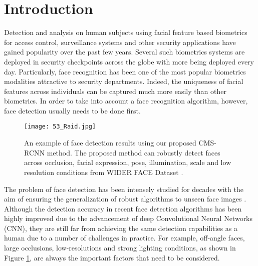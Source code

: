 \documentclass[10pt,journal,cspaper,compsoc]{IEEEtran}
\begin{document}
\maketitle

\IEEEdisplaynotcompsoctitleabstractindextext


\IEEEpeerreviewmaketitle


\section{Introduction}

Detection and analysis on human subjects using facial feature based biometrics for access control, surveillance systems and other security applications have gained popularity over the past few years. Several such biometrics systems are deployed in security checkpoints across the globe with more being deployed every day.
Particularly, face recognition has been one of the most popular biometrics modalities attractive to security departments. Indeed, the uniqueness of facial features across individuals can be captured much more easily than other biometrics. In order to take into account a face recognition algorithm, however, face detection usually needs to be done first.
\begin{figure}[!t]
	\centering \texttt{[image: 53\_Raid.jpg]}
		\caption{An example of face detection results using our proposed CMS-RCNN method. The proposed method can robustly detect faces across occlusion, facial expression, pose, illumination, scale and low resolution conditions from WIDER FACE Dataset \cite{yang2016wider}. }
	\label{fig:face_det_1}
\end{figure}

The problem of face detection has been intensely studied for decades with the aim of ensuring the generalization of robust algorithms to unseen face images \cite{viola2001rapid,zhang2010survey,zhu2012face,li2013learning,li2013pep-adapt,markuvs2013pico,li2014exemplar,mathias2014face,chen2014jointcascade,yang2014acf-multiscale,ghiasi2015multireshpm,liao2014npdface}. Although the detection accuracy in recent face detection algorithms \cite{li2015cascadecnn,farfade2015ddfd,yang2015faceness,ranjan2015dp2mfd,yang2015ccf,ranjan2016hyperface} has been highly improved due to the advancement of deep Convolutional Neural Networks (CNN), they are still far from achieving the same detection capabilities as a human due to a number of challenges in practice. For example, off-angle faces, large occlusions, low-resolutions and strong lighting conditions, as shown in Figure \ref{fig:face_det_1}, are always the important factors that need to be considered.
\end{document}

